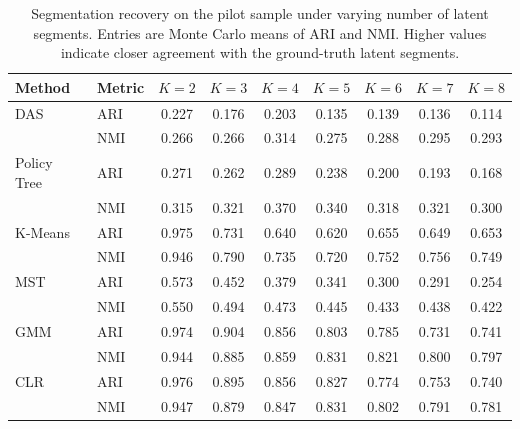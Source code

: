 \begin{table}[htbp]
\centering
\caption{Segmentation recovery on the pilot sample under varying number of latent segments. Entries are Monte Carlo means of ARI and NMI. Higher values indicate closer agreement with the ground-truth latent segments.}
\label{tab:app-ari-nmi-varying-K}
\begin{tabular}{llccccccc}
\toprule
Method & Metric & $K=2$ & $K=3$ & $K=4$ & $K=5$ & $K=6$ & $K=7$ & $K=8$ \\
\midrule
DAS & ARI & 0.227 & 0.176 & 0.203 & 0.135 & 0.139 & 0.136 & 0.114 \\
 & NMI & 0.266 & 0.266 & 0.314 & 0.275 & 0.288 & 0.295 & 0.293 \\
\addlinespace
Policy Tree & ARI & 0.271 & 0.262 & 0.289 & 0.238 & 0.200 & 0.193 & 0.168 \\
 & NMI & 0.315 & 0.321 & 0.370 & 0.340 & 0.318 & 0.321 & 0.300 \\
\addlinespace
K-Means & ARI & 0.975 & 0.731 & 0.640 & 0.620 & 0.655 & 0.649 & 0.653 \\
 & NMI & 0.946 & 0.790 & 0.735 & 0.720 & 0.752 & 0.756 & 0.749 \\
\addlinespace
MST & ARI & 0.573 & 0.452 & 0.379 & 0.341 & 0.300 & 0.291 & 0.254 \\
 & NMI & 0.550 & 0.494 & 0.473 & 0.445 & 0.433 & 0.438 & 0.422 \\
\addlinespace
GMM & ARI & 0.974 & 0.904 & 0.856 & 0.803 & 0.785 & 0.731 & 0.741 \\
 & NMI & 0.944 & 0.885 & 0.859 & 0.831 & 0.821 & 0.800 & 0.797 \\
\addlinespace
CLR & ARI & 0.976 & 0.895 & 0.856 & 0.827 & 0.774 & 0.753 & 0.740 \\
 & NMI & 0.947 & 0.879 & 0.847 & 0.831 & 0.802 & 0.791 & 0.781 \\
\bottomrule
\end{tabular}
\end{table}
